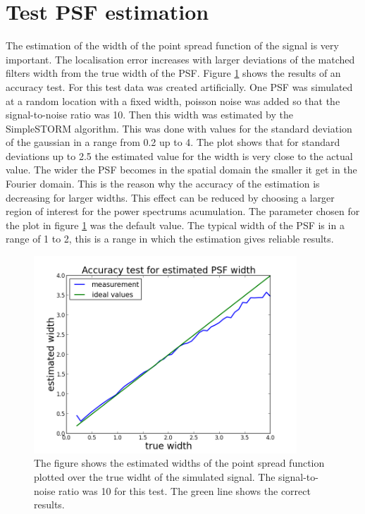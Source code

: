 \section{Test PSF estimation}
The estimation of the width of the point spread function of the signal is very important. The localisation error increases with larger deviations of the matched filters width from the true width of the PSF. Figure \ref{estimatedSigma} shows the results of an accuracy test. For this test data was created artificially. One PSF was simulated at a random location with a fixed width, poisson noise was added so that the signal-to-noise ratio was 10. Then this width was estimated by the SimpleSTORM algorithm. This was done with values for the standard deviation of the gaussian in a range from 0.2 up to 4. The plot shows that for standard deviations up to 2.5 the estimated value for the width is very close to the actual value. The wider the PSF becomes in the spatial domain the smaller it get in the Fourier domain. This is the reason why the accuracy of the estimation is decreasing for larger widths. This effect can be reduced by choosing a larger region of interest for the power spectrums acumulation. The parameter chosen for the plot in figure \ref{estimatedSigma} was the default value. The typical width of the PSF is in a range of 1 to 2, this is a range in which the estimation gives reliable results.
\begin{figure}
\centering
\includegraphics[width = 0.88\textwidth]{pictures/AccuracyTestPSFWidth.png}
	 \caption{The figure shows the estimated widths of the point spread function plotted over the true widht of the simulated signal. The signal-to-noise ratio was 10 for this test. The green line shows the correct results.}
	\label{estimatedSigma}
\end{figure}


